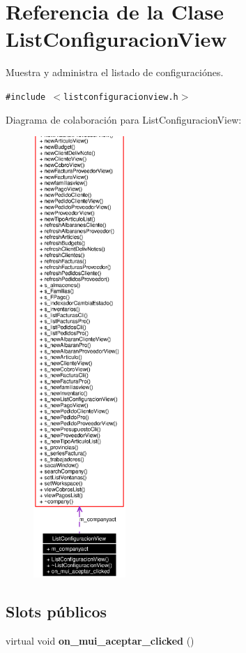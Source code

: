 \section{Referencia de la Clase List\-Configuracion\-View}
\label{classListConfiguracionView}
Muestra y administra el listado de configuraci\'{o}nes.  


{\tt \#include $<$listconfiguracionview.h$>$}

Diagrama de colaboraci\'{o}n para List\-Configuracion\-View:\begin{figure}[H]
\begin{center}
\leavevmode
\includegraphics[width=99pt]{classListConfiguracionView__coll__graph}
\end{center}
\end{figure}
\subsection*{Slots p\'{u}blicos}
\begin{CompactItemize}
\item 
virtual void {\bf on\_\-mui\_\-aceptar\_\-clicked} ()\label{classListConfiguracionView_i0}

\end{CompactItemize}
